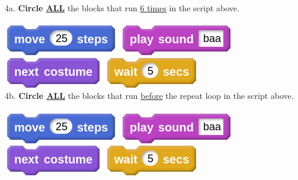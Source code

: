 \documentclass[letterpaper,12pt]{article}
\begin{document}
\noindent 4a. \textbf{Circle \underline{ALL}} the blocks that run \underline{6 times} in the script above. \\ \\
\includegraphics[scale=.4]{q4_script1.png} \hspace{1cm}
\includegraphics[scale=.4]{q4_script2.png} \hspace{1cm}
\includegraphics[scale=.4]{q4_script3.png} \hspace{1cm}
\includegraphics[scale=.4]{q4_script4.png} \hspace{1cm}\\

\noindent 4b. \textbf{Circle \underline{ALL}} the blocks that run \underline{before} the repeat loop in the script above. \\ \\
\includegraphics[scale=.4]{q4_script1.png} \hspace{1cm}
\includegraphics[scale=.4]{q4_script2.png} \hspace{1cm}
\includegraphics[scale=.4]{q4_script3.png} \hspace{1cm}
\includegraphics[scale=.4]{q4_script4.png} \hspace{1cm}\\
\end{document}
